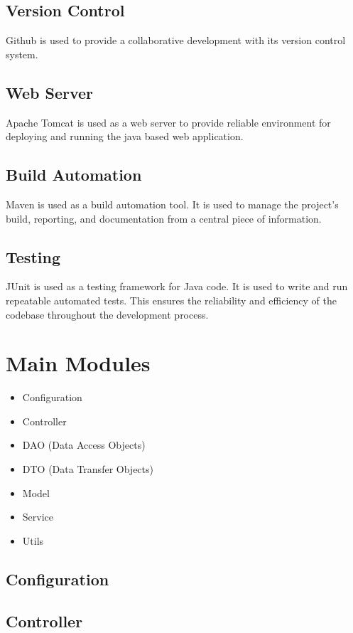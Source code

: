 \subsection*{Version Control} Github is used to provide a collaborative development with its version control system.

\subsection*{Web Server} Apache Tomcat is used as a web server to provide reliable environment for deploying and running the java based web application.

\subsection*{Build Automation} Maven is used as a build automation tool. It is used to manage the project's build, reporting, and documentation from a central piece of information.

\subsection*{Testing}JUnit is used as a testing framework for Java code. It is used to write and run repeatable automated tests. This ensures the reliability and efficiency of the codebase throughout the development process.





\section{Main Modules}
\begin{itemize}
    \item Configuration
    \item Controller
    \item DAO (Data Access Objects)
    \item DTO (Data Transfer Objects)
    \item Model 
    \item Service
    \item Utils
\end{itemize}
\subsection*{Configuration}
\subsection*{Controller}
